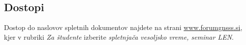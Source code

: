

\subsection{Dostopi}
Dostop do naslovov spletnih dokumentov najdete na strani \url{www.forumgnsss.si}, kjer v rubriki \textit{Za študente} izberite \textit{spletnjača vesoljsko vreme, seminar LEN}.


